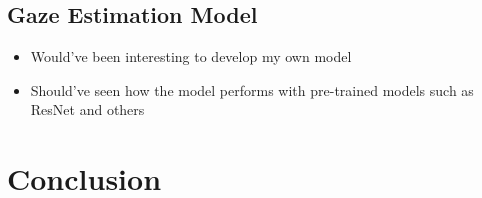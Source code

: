 \documentclass[twocolumn]{report}
\begin{document}
\section{Gaze Estimation Model}






\begin{itemize}
    \item Would've been interesting to develop my own model
    \item Should've seen how the model performs with pre-trained models such as ResNet and others
\end{itemize}

\chapter{Conclusion}

\printbibliography
\end{document}
